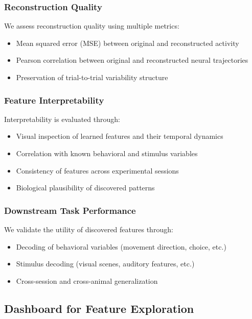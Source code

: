 \subsubsection{Reconstruction Quality}

We assess reconstruction quality using multiple metrics:
\begin{itemize}
\item Mean squared error (MSE) between original and reconstructed activity
\item Pearson correlation between original and reconstructed neural trajectories
\item Preservation of trial-to-trial variability structure
\end{itemize}

\subsubsection{Feature Interpretability}

Interpretability is evaluated through:
\begin{itemize}
\item Visual inspection of learned features and their temporal dynamics
\item Correlation with known behavioral and stimulus variables
\item Consistency of features across experimental sessions
\item Biological plausibility of discovered patterns
\end{itemize}

\subsubsection{Downstream Task Performance}

We validate the utility of discovered features through:
\begin{itemize}
\item Decoding of behavioral variables (movement direction, choice, etc.)
\item Stimulus decoding (visual scenes, auditory features, etc.)
\item Cross-session and cross-animal generalization
\end{itemize}

\subsection{Dashboard for Feature Exploration}

